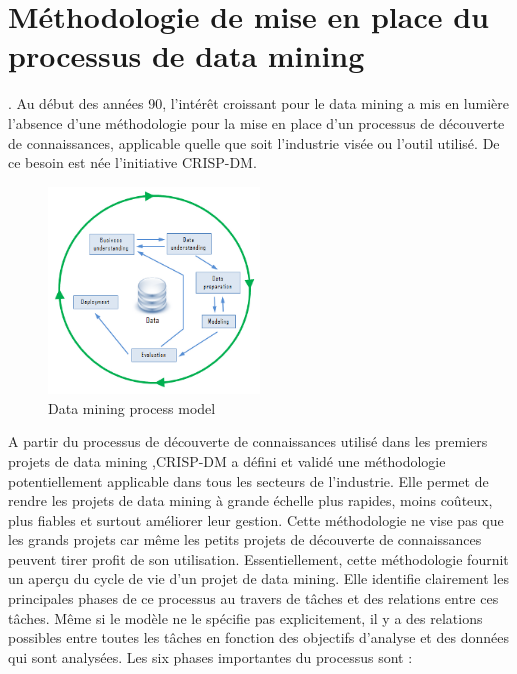 \section{Méthodologie de mise en place du processus de data mining\cite{DMProces}}.
Au début des années 90, l'intérêt croissant  pour le data mining a mis en lumière l'absence d'une méthodologie pour la mise en place d'un processus de découverte de connaissances, applicable quelle que soit l'industrie visée ou l'outil utilisé. De ce besoin est née l'initiative \ac{CRISP-DM}.
\begin{figure}[ht]
	\centering
	\includegraphics[width=0.5\textwidth]{fig/CRISP_tb.png}
	\caption[Short caption]{Data mining process model}
	\label{fig:imageCrisp}
\end{figure} 
A partir du processus de découverte de connaissances utilisé dans les premiers projets de data mining ,\ac{CRISP-DM} a défini et validé une méthodologie potentiellement applicable dans tous les secteurs de l'industrie. Elle permet de rendre les projets de data mining à grande échelle plus rapides, moins coûteux, plus fiables et surtout améliorer leur gestion. Cette méthodologie ne vise pas que les grands projets car même les petits projets de découverte de connaissances peuvent tirer profit de son utilisation.
Essentiellement, cette méthodologie fournit un aperçu du cycle de vie d'un projet de data mining. Elle identifie clairement les principales phases de ce processus au travers de tâches et des relations entre ces tâches. Même si le modèle ne le spécifie pas explicitement, il y a des relations possibles entre toutes les tâches en fonction des objectifs d'analyse et des données qui sont analysées.
Les six phases importantes du processus sont :
